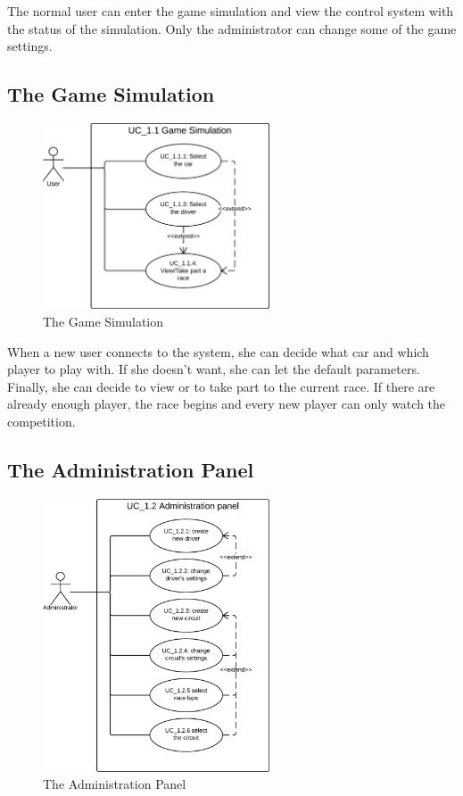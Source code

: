 The normal user can enter the game simulation and view the control system with the status of the simulation. Only the administrator can change some of the game settings.

\subsection{The Game Simulation}

\begin{figure}[H]
\centering %
\includegraphics[width=0.6\textwidth]{./img/UML/GameSimulation.png}
\caption{The Game Simulation}
\label{fig:GameSimulation}
\end{figure}

When a new user connects to the system, she can decide what car and which player to play with. If she doesn't want, she can let the default parameters. Finally, she can decide to view or to take part to the current race. If there are already enough player, the race begins and every new player can only watch the competition.

\subsection{The Administration Panel}

\begin{figure}[H]
\centering %
\includegraphics[width=0.6\textwidth]{./img/UML/AdministrationPanel.png}
\caption{The Administration Panel}
\label{fig:AdministrationPanel}
\end{figure}

